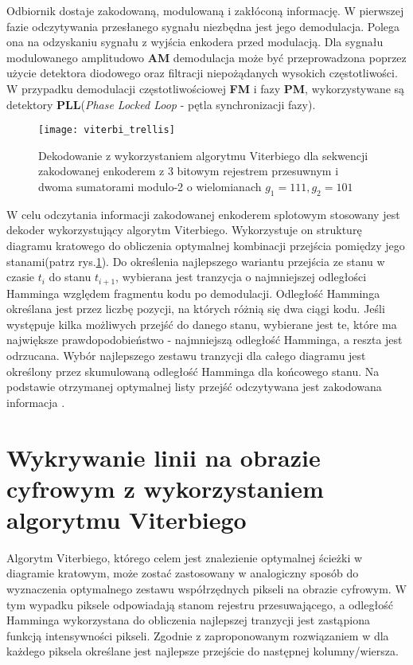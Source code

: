 \documentclass[document.tex]{subfiles}
\begin{document}
\indent Odbiornik dostaje zakodowaną, modulowaną i zakłóconą informację. W pierwszej fazie odczytywania przesłanego sygnału niezbędna jest jego demodulacja. Polega ona na odzyskaniu sygnału z wyjścia enkodera przed modulacją.
Dla sygnału modulowanego amplitudowo \textbf{AM} demodulacja może być przeprowadzona poprzez użycie detektora diodowego oraz filtracji niepożądanych wysokich częstotliwości.\cite{demodulation_am}
W przypadku demodulacji częstotliwościowej \textbf{FM} i fazy \textbf{PM}, wykorzystywane są detektory \textbf{PLL}(\textit{Phase Locked Loop} - pętla synchronizacji fazy)\cite{demodulation_fmpm}.

\begin{figure}[h]
\texttt{[image: viterbi\_trellis]}
\caption{Dekodowanie z wykorzystaniem algorytmu Viterbiego dla sekwencji zakodowanej enkoderem z 3 bitowym rejestrem przesuwnym i dwoma sumatorami modulo-2 o wielomianach $g_1 = 111, g_2 = 101$ \protect\cite{Comm_Sklar}}
\label{fig:viterbi_trellis}
\end{figure}

\indent W celu odczytania informacji zakodowanej enkoderem splotowym stosowany jest dekoder
wykorzystujący algorytm Viterbiego. Wykorzystuje on strukturę diagramu kratowego do obliczenia optymalnej
kombinacji przejścia pomiędzy jego stanami(patrz rys.\ref{fig:viterbi_trellis}). Do określenia najlepszego wariantu przejścia ze stanu w czasie $t_i$ do stanu $t_{i+1}$, wybierana jest tranzycja o najmniejszej odległości Hamminga\cite{Comm_Sklar} względem fragmentu kodu po demodulacji. Odległość Hamminga określana jest przez liczbę pozycji, na których różnią się dwa ciągi kodu.
Jeśli występuje kilka możliwych przejść do danego stanu, wybierane jest te, które ma największe prawdopodobieństwo - najmniejszą odległość Hamminga, a reszta jest odrzucana. Wybór najlepszego zestawu tranzycji
dla całego diagramu jest określony przez skumulowaną odległość Hamminga dla końcowego stanu. 
Na podstawie otrzymanej optymalnej listy przejść odczytywana jest zakodowana informacja .\cite{Comm_Sklar}\cite{viterbi_tutorial}\cite{viterbi_mit}
 
\section{Wykrywanie linii na obrazie cyfrowym z wykorzystaniem algorytmu Viterbiego}\label{viterbi_line}
\indent Algorytm Viterbiego, którego celem jest znalezienie optymalnej ścieżki w diagramie kratowym, może zostać zastosowany w analogiczny sposób do wyznaczenia optymalnego zestawu współrzędnych pikseli na obrazie cyfrowym.
W tym wypadku piksele odpowiadają stanom rejestru przesuwającego, a odległość Hamminga wykorzystana do obliczenia najlepszej tranzycji jest zastąpiona funkcją intensywności pikseli. Zgodnie z zaproponowanym rozwiązaniem w \cite{viterbi_ch_9} dla każdego piksela określane jest najlepsze przejście do następnej kolumny/wiersza.
\end{document}

